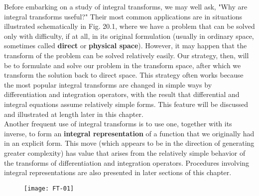 Before embarking on a study of integral transforms, we may well ask, "Why are integral transforms useful?" Their most common applications are in situations illustrated schematically in Fig. 20.1, where we have a problem that can be solved only with difficulty, if at all, in its original formulation (usually in ordinary space, sometimes called \textbf{direct }or \textbf{physical space}). However, it may happen that the transform of the problem can be solved relatively easily. Our strategy, then, will be to formulate and solve our problem in the transform space, after which we transform the solution back to direct space. This strategy often works because the most popular integral transforms are changed in simple ways by differentiation and integration operators, with the result that differential and integral equations assume relatively simple forms. This feature will be discussed and illustrated at length later in this chapter.\\
Another frequent use of integral transforms is to use one, together with its inverse, to form an \textbf{integral representation} of a function that we originally had in an explicit form. This move (which appears to be in the direction of generating greater complexity) has value that arises from the relatively simple behavior of the transforms of differentiation and integration operators. Procedures involving integral representations are also presented in later sections of this chapter.
\begin{figure}[H]
	\centering
	\texttt{[image: FT-01]}
\end{figure}
